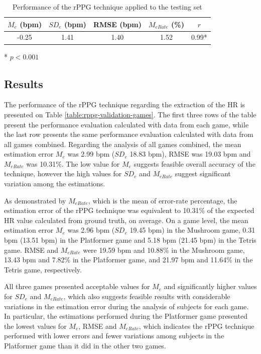 \begin{table}
\caption{Performance of the rPPG technique applied to the testing set}
\label{table:rppg-validation}
\centering
\begin{threeparttable}
  \begin{tabular}{ccccc}
  \toprule
    $M_e$ (bpm) & $SD_e$ (bpm) & RMSE (bpm) & $M_{eRate}$ (\%) & $r$ \\
  \midrule
    -0.25 & 1.41 & 1.40 & 1.52 & 0.99* \\
  \bottomrule
  \end{tabular}
  \begin{tablenotes}
    \small
    \item[*]{$p < 0.001$}
  \end{tablenotes}
\end{threeparttable}
\end{table}

\subsection{Results}

The performance of the rPPG technique regarding the extraction of the HR is presented on Table \ref{table:rppg-validation-games}. The first three rows of the table present the performance evaluation calculated with data from each game, while the last row presents the same performance evaluation calculated with data from all games combined. Regarding the analysis of all games combined, the mean estimation error $M_e$ was 2.99 bpm ($SD_e$ 18.83 bpm), RMSE was 19.03 bpm and $M_{eRate}$ was 10.31\%. The low value for $M_e$ suggests feasible overall accuracy of the technique, however the high values for $SD_e$ and $M_{eRate}$ suggest significant variation among the estimations.

As demonstrated by $M_{eRate}$, which is the mean of error-rate percentage, the estimation error of the rPPG technique was equivalent to 10.31\% of the expected HR value calculated from ground truth, on average. On a game level, the mean estimation error $M_e$ was 2.96 bpm ($SD_e$ 19.45 bpm) in the Mushroom game, 0.31 bpm (13.51 bpm) in the Platformer game and 5.18 bpm (21.45 bpm) in the Tetris game. RMSE and $M_{eRate}$ were 19.59 bpm and 10.88\% in the Mushroom game, 13.43 bpm and 7.82\% in the Platformer game, and 21.97 bpm and 11.64\% in the Tetris game, respectively.

All three games presented acceptable values for $M_e$ and significantly higher values for $SD_e$ and $M_{eRate}$, which also suggests feasible results with considerable variations in the estimation error during the analysis of subjects for each game. In particular, the estimations performed during the Platformer game presented the lowest values for $M_e$, RMSE and $M_{eRate}$, which indicates the rPPG technique performed with lower errors and fewer variations among subjects in the Platformer game than it did in the other two games.

